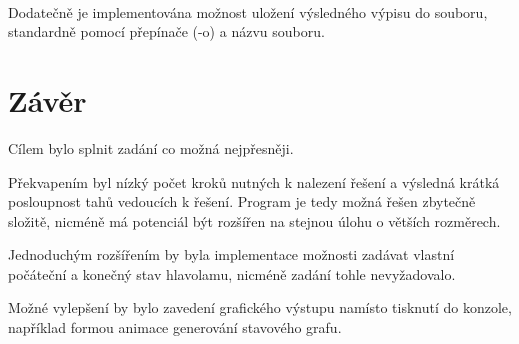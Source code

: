 \documentclass[12pt]{article}
\begin{document}
\paragraph{}
Dodatečně je implementována možnost uložení výsledného výpisu do souboru,
standardně pomocí přepínače (-o) a názvu souboru.


\section{Závěr}
Cílem bylo splnit zadání co možná nejpřesněji. 

Překvapením byl nízký počet kroků nutných k nalezení řešení a výsledná krátká
posloupnost tahů vedoucích k řešení. Program je tedy možná řešen zbytečně
složitě, nicméně má potenciál být rozšířen na stejnou úlohu o větších
rozměrech.

Jednoduchým rozšířením by byla implementace možnosti zadávat vlastní počáteční
a konečný stav hlavolamu, nicméně zadání tohle nevyžadovalo.

Možné vylepšení by bylo zavedení grafického výstupu namísto tisknutí do
konzole, například formou animace generování stavového grafu.
\end{document}
